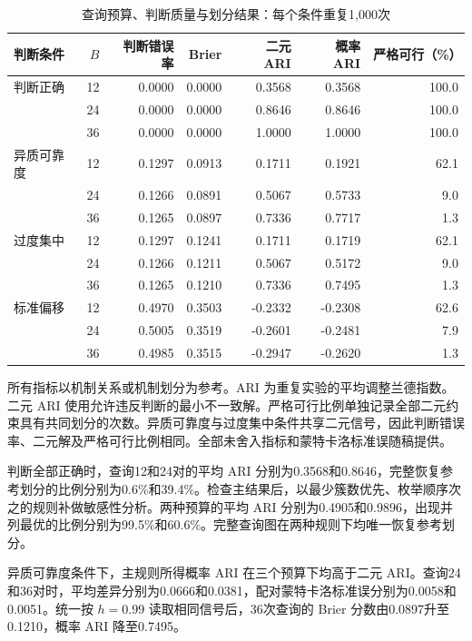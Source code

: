 \documentclass[UTF8,a4paper,zihao=-4,fontset=fandol]{ctexart}
\begin{document}
\begin{table}[!htbp]
\centering\small
\caption{查询预算、判断质量与划分结果：每个条件重复1,000次}\label{tab:simulation}
\begin{tabular}{@{}lrrrrrr@{}}
\toprule
判断条件 & $B$ & 判断错误率 & Brier & 二元 ARI & 概率 ARI & 严格可行（\%） \\
\midrule
判断正确 & 12 & 0.0000 & 0.0000 & 0.3568 & 0.3568 & 100.0 \\
 & 24 & 0.0000 & 0.0000 & 0.8646 & 0.8646 & 100.0 \\
 & 36 & 0.0000 & 0.0000 & 1.0000 & 1.0000 & 100.0 \\
\addlinespace
异质可靠度 & 12 & 0.1297 & 0.0913 & 0.1711 & 0.1921 & 62.1 \\
 & 24 & 0.1266 & 0.0891 & 0.5067 & 0.5733 & 9.0 \\
 & 36 & 0.1265 & 0.0897 & 0.7336 & 0.7717 & 1.3 \\
\addlinespace
过度集中 & 12 & 0.1297 & 0.1241 & 0.1711 & 0.1719 & 62.1 \\
 & 24 & 0.1266 & 0.1211 & 0.5067 & 0.5172 & 9.0 \\
 & 36 & 0.1265 & 0.1210 & 0.7336 & 0.7495 & 1.3 \\
\addlinespace
标准偏移 & 12 & 0.4970 & 0.3503 & -0.2332 & -0.2308 & 62.6 \\
 & 24 & 0.5005 & 0.3519 & -0.2601 & -0.2481 & 7.9 \\
 & 36 & 0.4985 & 0.3515 & -0.2947 & -0.2620 & 1.3 \\
\bottomrule
\end{tabular}
\vspace{0.3em}
\parbox{\textwidth}{\footnotesize 所有指标以机制关系或机制划分为参考。ARI 为重复实验的平均调整兰德指数。二元 ARI 使用允许违反判断的最小不一致解。严格可行比例单独记录全部二元约束具有共同划分的次数。异质可靠度与过度集中条件共享二元信号，因此判断错误率、二元解及严格可行比例相同。全部未舍入指标和蒙特卡洛标准误随稿提供。}
\end{table}
\FloatBarrier

判断全部正确时，查询12和24对的平均 ARI 分别为0.3568和0.8646，完整恢复参考划分的比例分别为0.6\%和39.4\%。检查主结果后，以最少簇数优先、枚举顺序次之的规则补做敏感性分析。两种预算的平均 ARI 分别为0.4905和0.9896，出现并列最优的比例分别为99.5\%和60.6\%。完整查询图在两种规则下均唯一恢复参考划分。

异质可靠度条件下，主规则所得概率 ARI 在三个预算下均高于二元 ARI。查询24和36对时，平均差异分别为0.0666和0.0381，配对蒙特卡洛标准误分别为0.0058和0.0051。统一按 $h=0.99$ 读取相同信号后，36次查询的 Brier 分数由0.0897升至0.1210，概率 ARI 降至0.7495。
\end{document}
